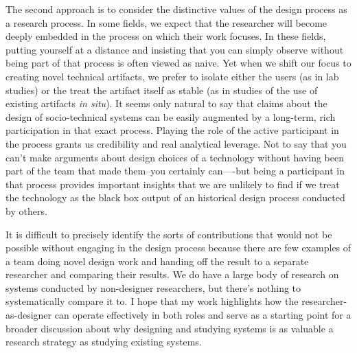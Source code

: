 The second approach is to consider the distinctive values of the design process as a research process. In some fields, we expect that the researcher will become deeply embedded in the process on which their work focuses. In these fields, putting yourself at a distance and insisting that you can simply observe without being part of that process is often viewed as naive. Yet when we shift our focus to creating novel technical artifacts, we prefer to isolate either the users (as in lab studies) or the treat the artifact itself as stable (as in studies of the use of existing artifacts \emph{in situ}). It seems only natural to say that claims about the design of socio-technical systems can be easily augmented by a long-term, rich participation in that exact process. Playing the role of the active participant in the process grants us credibility and real analytical leverage. Not to say that you can't make arguments about design choices of a technology without having been part of the team that made them--you certainly can—-but being a participant in that process provides important insights that we are unlikely to find if we treat the technology as the black box output of an historical design process conducted by others. 



It is difficult to precisely identify the sorts of contributions that would not be possible without engaging in the design process because there are few examples of a team doing novel design work and handing off the result to a separate researcher and comparing their results. We do have a large body of research on systems conducted by non-designer researchers, but there's nothing to systematically compare it to. I hope that my work highlights how the researcher-as-designer can operate effectively in both roles and serve as a starting point for a broader discussion about why designing and studying systems is as valuable a research strategy as studying existing systems. 

